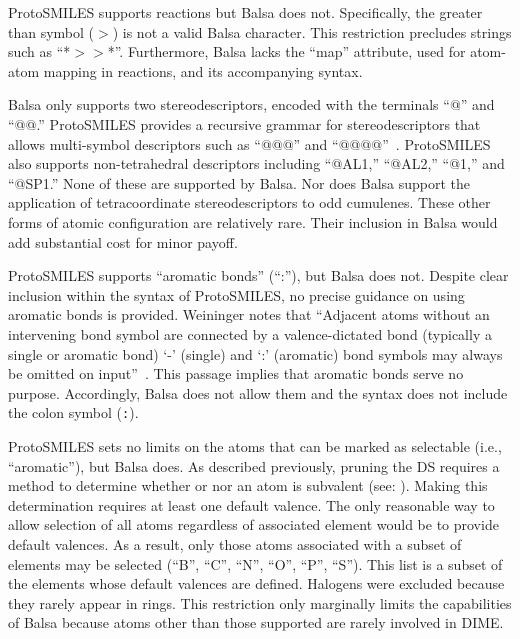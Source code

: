 \documentclass{article}
\def\ttt{\texttt}
\begin{document}
ProtoSMILES supports reactions but Balsa does not. Specifically, the greater than symbol (\ttt{$>$}) is not a valid Balsa character. This restriction precludes strings such as \enquote{*$>$$>$*}. Furthermore, Balsa lacks the \enquote{map} attribute, used for atom-atom mapping in reactions, and its accompanying syntax.

Balsa only supports two stereodescriptors, encoded with the terminals \enquote{@} and \enquote{@@.} ProtoSMILES provides a recursive grammar for stereodescriptors that allows multi-symbol descriptors such as \enquote{@@@} and \enquote{@@@@}~\cite[p.~94]{weininger:2003}. ProtoSMILES also supports non-tetrahedral descriptors including \enquote{@AL1,} \enquote{@AL2,} \enquote{@1,} and \enquote{@SP1.} None of these are supported by Balsa. Nor does Balsa support the application of tetracoordinate stereodescriptors to odd cumulenes. These other forms of atomic configuration are relatively rare. Their inclusion in Balsa would add substantial cost for minor payoff.

ProtoSMILES supports \enquote{aromatic bonds} (\enquote{:}), but Balsa does not. Despite clear inclusion within the syntax of ProtoSMILES, no precise guidance on using aromatic bonds is provided. Weininger notes that \enquote{Adjacent atoms without an intervening bond symbol are connected by a valence-dictated bond (typically a single or aromatic bond) \enquote{-} (single) and \enquote{:} (aromatic) bond symbols may always be omitted on input}~\cite[p.~85]{weininger:2003}. This passage implies that aromatic bonds serve no purpose. Accordingly, Balsa does not allow them and the syntax does not include the colon symbol (\ttt{:}).


ProtoSMILES sets no limits on the atoms that can be marked as selectable (i.e., \enquote{aromatic}), but Balsa does. As described previously, pruning the DS requires a method to determine whether or nor an atom is subvalent (see: ). Making this determination requires at least one default valence. The only reasonable way to allow selection of all atoms regardless of associated element would be to provide default valences. As a result, only those atoms associated with a subset of elements may be selected (\enquote{B}, \enquote{C}, \enquote{N}, \enquote{O}, \enquote{P}, \enquote{S}). This list is a subset of the elements whose default valences are defined. Halogens were excluded because they rarely appear in rings. This restriction only marginally limits the capabilities of Balsa because atoms other than those supported are rarely involved in DIME.
\end{document}
